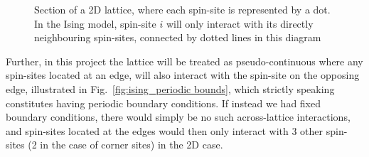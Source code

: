 \documentclass[10pt,showpacs,preprintnumbers,amsmath,amssymb,nofootinbib,aps,prl,twocolumn,groupedaddress,superscriptaddress,showkeys]{revtex4-1}
\begin{document}
    \begin{figure}[H]
      \centering
      \caption{Section of a 2D lattice, where each spin-site is represented by a dot. In the Ising model, spin-site $i$ will only interact with its directly neighbouring spin-sites, connected by dotted lines in this diagram\label{fig:spinsites}}
    \end{figure}

    Further, in this project the lattice will be treated as pseudo-continuous where any spin-sites located at an edge, will also interact with the spin-site on the opposing edge, illustrated in Fig.~\ref{fig:ising_periodic bounds}, which strictly speaking constitutes having periodic boundary conditions. If instead we had fixed boundary conditions, there would simply be no such across-lattice interactions, and spin-sites located at the edges would then only interact with 3 other spin-sites (2 in the case of corner sites) in the 2D case.
\end{document}
